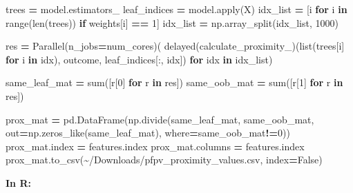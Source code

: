 \documentclass[
  11pt,
  oneside]{book}
\newenvironment{Shaded}{\begin{snugshade}}{\end{snugshade}}
\newcommand{\BuiltInTok}[1]{#1}
\newcommand{\ControlFlowTok}[1]{\textcolor[rgb]{0.13,0.29,0.53}{\textbf{#1}}}
\newcommand{\DecValTok}[1]{\textcolor[rgb]{0.00,0.00,0.81}{#1}}
\newcommand{\KeywordTok}[1]{\textcolor[rgb]{0.13,0.29,0.53}{\textbf{#1}}}
\newcommand{\NormalTok}[1]{#1}
\newcommand{\OperatorTok}[1]{\textcolor[rgb]{0.81,0.36,0.00}{\textbf{#1}}}
\newcommand{\StringTok}[1]{\textcolor[rgb]{0.31,0.60,0.02}{#1}}
\newcommand{\VariableTok}[1]{\textcolor[rgb]{0.00,0.00,0.00}{#1}}
\begin{document}
\begin{Shaded}
\begin{Highlighting}[]
\NormalTok{trees }\OperatorTok{=}\NormalTok{ model.estimators\_}
\NormalTok{leaf\_indices }\OperatorTok{=}\NormalTok{ model.}\BuiltInTok{apply}\NormalTok{(X)}
\NormalTok{idx\_list }\OperatorTok{=}\NormalTok{ [i }\ControlFlowTok{for}\NormalTok{ i }\KeywordTok{in} \BuiltInTok{range}\NormalTok{(}\BuiltInTok{len}\NormalTok{(trees)) }\ControlFlowTok{if}\NormalTok{ weights[i] }\OperatorTok{==} \DecValTok{1}\NormalTok{]}
\NormalTok{idx\_list }\OperatorTok{=}\NormalTok{ np.array\_split(idx\_list, }\DecValTok{1000}\NormalTok{)}

\NormalTok{res }\OperatorTok{=}\NormalTok{ Parallel(n\_jobs}\OperatorTok{=}\NormalTok{num\_cores)(}
\NormalTok{    delayed(calculate\_proximity\_)(}\BuiltInTok{list}\NormalTok{(trees[i] }\ControlFlowTok{for}\NormalTok{ i }\KeywordTok{in}\NormalTok{ idx), outcome, leaf\_indices[:, idx]) }\ControlFlowTok{for}\NormalTok{ idx }\KeywordTok{in}\NormalTok{ idx\_list)}

\NormalTok{same\_leaf\_mat }\OperatorTok{=} \BuiltInTok{sum}\NormalTok{([r[}\DecValTok{0}\NormalTok{] }\ControlFlowTok{for}\NormalTok{ r }\KeywordTok{in}\NormalTok{ res])}
\NormalTok{same\_oob\_mat }\OperatorTok{=} \BuiltInTok{sum}\NormalTok{([r[}\DecValTok{1}\NormalTok{] }\ControlFlowTok{for}\NormalTok{ r }\KeywordTok{in}\NormalTok{ res])}

\NormalTok{prox\_mat }\OperatorTok{=}\NormalTok{ pd.DataFrame(np.divide(same\_leaf\_mat, same\_oob\_mat, out}\OperatorTok{=}\NormalTok{np.zeros\_like(same\_leaf\_mat), }
\NormalTok{                        where}\OperatorTok{=}\NormalTok{same\_oob\_mat}\OperatorTok{!=}\DecValTok{0}\NormalTok{))}
\NormalTok{prox\_mat.index }\OperatorTok{=}\NormalTok{ features.index}
\NormalTok{prox\_mat.columns }\OperatorTok{=}\NormalTok{ features.index}
\NormalTok{prox\_mat.to\_csv(}\StringTok{\textquotesingle{}\textasciitilde{}/Downloads/pfpv\_proximity\_values.csv\textquotesingle{}}\NormalTok{, index}\OperatorTok{=}\VariableTok{False}\NormalTok{)}
\end{Highlighting}
\end{Shaded}

\textbf{In R: }
\end{document}
